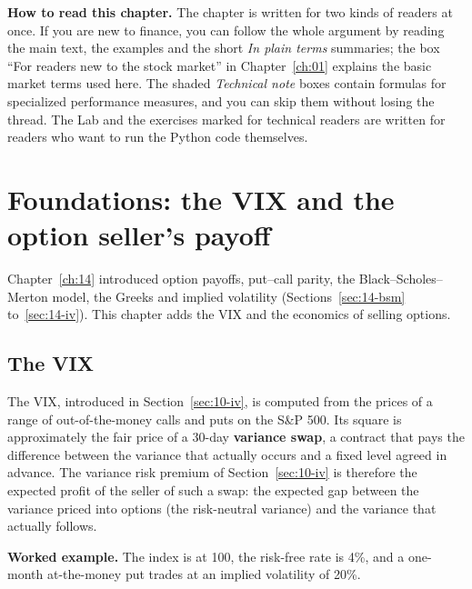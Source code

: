 \begin{callout}
\textbf{How to read this chapter.} The chapter is written for two kinds of readers at once. If you are new to finance, you can follow the whole argument by reading the main text, the examples and the short \emph{In plain terms} summaries; the box ``For readers new to the stock market'' in Chapter~\ref{ch:01} explains the basic market terms used here. The shaded \emph{Technical note} boxes contain formulas for specialized performance measures, and you can skip them without losing the thread. The Lab and the exercises marked for technical readers are written for readers who want to run the Python code themselves.
\end{callout}

\section{Foundations: the VIX and the option seller's payoff}
\label{sec:16-foundations}

Chapter~\ref{ch:14} introduced option payoffs, put--call parity, the Black--Scholes--Merton model, the Greeks and implied volatility (Sections~\ref{sec:14-bsm} to~\ref{sec:14-iv}). This chapter adds the VIX and the economics of selling options.

\subsection{The VIX}

The VIX, introduced in Section~\ref{sec:10-iv}, is computed from the prices of a range of out-of-the-money calls and puts on the S\&P 500. Its square is approximately the fair price of a 30-day \textbf{variance swap}, a contract that pays the difference between the variance that actually occurs and a fixed level agreed in advance. The variance risk premium of Section~\ref{sec:10-iv} is therefore the expected profit of the seller of such a swap: the expected gap between the variance priced into options (the risk-neutral variance) and the variance that actually follows.

\textbf{Worked example.} The index is at 100, the risk-free rate is 4\%, and a one-month at-the-money put trades at an implied volatility of 20\%.

